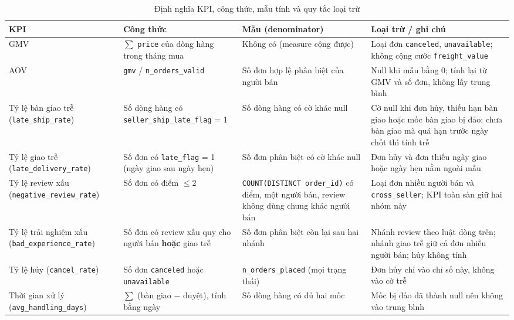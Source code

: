 \documentclass[a4paper]{article}
\begin{document}
\begin{table}[htbp]
\centering
\footnotesize
\setlength{\tabcolsep}{3pt}
\renewcommand{\arraystretch}{1.08}
\caption{Định nghĩa KPI, công thức, mẫu tính và quy tắc loại trừ}
\label{tab:kpi_definitions}
\begin{tabularx}{\textwidth}{@{}>{\raggedright\arraybackslash}p{2.35cm}>{\raggedright\arraybackslash}p{3.6cm}>{\raggedright\arraybackslash}p{3.6cm}>{\raggedright\arraybackslash}X@{}}
\toprule
\textbf{KPI} & \textbf{Công thức} & \textbf{Mẫu (denominator)} & \textbf{Loại trừ / ghi chú} \\
\midrule
GMV & $\sum$ \texttt{price} của dòng hàng trong tháng mua & Không có (measure cộng được) & Loại đơn \texttt{canceled}, \texttt{unavailable}; không cộng cước \texttt{freight\_\allowbreak{}value} \\
\addlinespace
AOV & \texttt{gmv} / \texttt{n\_\allowbreak{}orders\_\allowbreak{}valid} & Số đơn hợp lệ phân biệt của người bán & Null khi mẫu bằng 0; tính lại từ GMV và số đơn, không lấy trung bình \\
\addlinespace
Tỷ lệ bàn giao trễ (\texttt{late\_\allowbreak{}ship\_\allowbreak{}rate}) & Số dòng hàng có \texttt{seller\_\allowbreak{}ship\_\allowbreak{}late\_\allowbreak{}flag} = 1 & Số dòng hàng có cờ khác null & Cờ null khi đơn hủy, thiếu hạn bàn giao hoặc mốc bàn giao bị đảo; chưa bàn giao mà quá hạn trước ngày chốt thì tính trễ \\
\addlinespace
Tỷ lệ giao trễ (\texttt{late\_\allowbreak{}delivery\_\allowbreak{}rate}) & Số đơn có \texttt{late\_\allowbreak{}flag} = 1 (ngày giao sau ngày hẹn) & Số đơn phân biệt có cờ khác null & Đơn hủy và đơn thiếu ngày giao hoặc ngày hẹn nằm ngoài mẫu \\
\addlinespace
Tỷ lệ review xấu (\texttt{negative\_\allowbreak{}review\_\allowbreak{}rate}) & Số đơn có điểm $\le 2$ & \texttt{COUNT(DISTINCT order\_\allowbreak{}id)} có điểm, một người bán, review không dùng chung khác người bán & Loại đơn nhiều người bán và \texttt{cross\_\allowbreak{}seller}; KPI toàn sàn giữ hai nhóm này \\
\addlinespace
Tỷ lệ trải nghiệm xấu (\texttt{bad\_\allowbreak{}experience\_\allowbreak{}rate}) & Số đơn có review xấu quy cho người bán \textbf{hoặc} giao trễ & Số đơn phân biệt còn lại sau hai nhánh & Nhánh review theo luật dòng trên; nhánh giao trễ giữ cả đơn nhiều người bán; hủy không tính \\
\addlinespace
Tỷ lệ hủy (\texttt{cancel\_\allowbreak{}rate}) & Số đơn \texttt{canceled} hoặc \texttt{unavailable} & \texttt{n\_\allowbreak{}orders\_\allowbreak{}placed} (mọi trạng thái) & Đơn hủy chỉ vào chỉ số này, không vào cờ trễ \\
\addlinespace
Thời gian xử lý (\texttt{avg\_\allowbreak{}handling\_\allowbreak{}days}) & $\sum$ (bàn giao $-$ duyệt), tính bằng ngày & Số dòng hàng có đủ hai mốc & Mốc bị đảo đã thành null nên không vào trung bình \\
\bottomrule
\end{tabularx}
\end{table}
\end{document}
